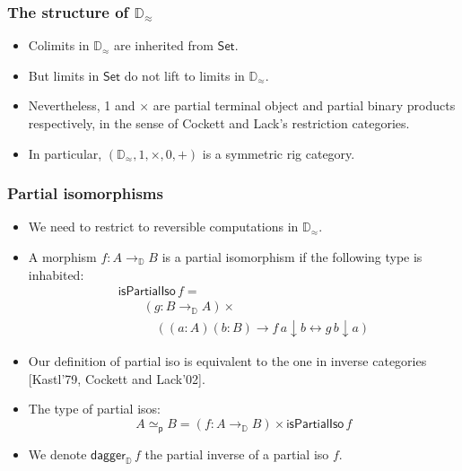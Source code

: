 \documentclass[12pt,t]{beamer}
\newcommand{\red}[1]{\textcolor{red}{#1}}
\newcommand{\Set}{\mathsf{Set}}
\newcommand{\dn}{\downarrow}
\newcommand{\D}{\mathbb{D}}
\newcommand{\Dapprox}{\mathbb{D}_{\approx}}
\newcommand{\piso}{\mathsf{isPartialIso}}
\newcommand{\daggerD}{\mathsf{dagger}_\D}
\begin{document}
\begin{frame}

  \frametitle{The structure of $\Dapprox$}
  \begin{itemize}
  \item Colimits in $\Dapprox$ are inherited from $\Set$.
  \item But limits in $\Set$ do not lift to limits in $\Dapprox$.
    \pause
    \vspace{\fill}
  \item Nevertheless, 1 and $\times$ are partial terminal object and
    partial binary products respectively, in the sense of Cockett and
    Lack's restriction categories.
  \item In particular, $(\Dapprox,1,\times,0,+)$ is a symmetric rig
    category.
    
  \end{itemize}
  
  
\end{frame}

\begin{frame}

  \frametitle{Partial isomorphisms}
  
  \begin{itemize}
  \item We need to restrict to reversible computations in $\Dapprox$.
  \item A morphism $f : A \to_\D B$ is a partial isomorphism if
    the following type is inhabited: %
    \[
    \begin{array}{l}
      \piso \,f = \\
      \qquad (g : B \to_\D A) \times \\
      \qquad \quad \left( (a : A) (b : B) \to  f
      \,a \dn b \leftrightarrow g \,b \dn a  \right)  
    \end{array}
    \]
    \item Our definition of partial iso is equivalent to the one in
      inverse categories [Kastl'79, Cockett and Lack'02].
    \item The type of partial isos:
      \[
      A \simeq_{\mathsf{p}} B = (f : A \to_\D B) \times \piso \,f
      \]
    \item We denote $\daggerD\,f$ the partial inverse of a partial iso $f$.
  \end{itemize}
  
  
\end{frame}
\end{document}
